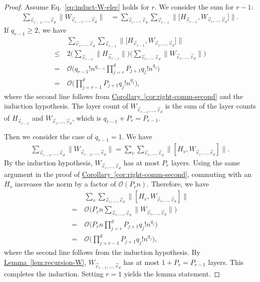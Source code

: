 \documentclass[aps,pra,reprint,groupedaddress,floatfix]{revtex4-2}
\newcommand{\cor}[1]{\hyperref[cor:#1]{Corollary~\ref*{cor:#1}}}
\newcommand{\lem}[1]{\hyperref[lem:#1]{Lemma~\ref*{lem:#1}}}
\newcommand{\mc}{\mathcal}
\begin{document}
\begin{proof}
    Assume Eq.~\eqref{eq:induct-W-elec} holds for $r$. We consider the sum for $r-1$:
    \begin{align*}
        \sum_{\vec{v}_{r-1}, \ldots, \vec{v}_d} \Big\|W_{\vec{v}_{r-1}, \ldots, \vec{v}_d}\Big\| 
        &= \sum_{\vec{v}_{r}, \ldots, \vec{v}_d} \sum_{\vec{v}_{r-1}} \bigg\| \Big[ H_{\vec{v}_{r-1}}, W_{\vec{v}_{r}, \ldots, \vec{v}_d} \Big] \bigg\|.
    \end{align*}
    If $q_{r-1}\ge 2$, we have
    \begin{align*}
        &\sum_{\vec{v}_{r}, \ldots, \vec{v}_d} \sum_{\vec{v}_{r-1}} \bigg\| \Big[ H_{\vec{v}_{r-1}}, W_{\vec{v}_{r}, \ldots, \vec{v}_d} \Big] \bigg\| \\
        \le~& 2\Big(\sum_{\vec{v}_{r-1}}\|H_{\vec{v}_{r-1}}\|\Big)\Big(\sum_{\vec{v}_{r}, \ldots, \vec{v}_d}\|W_{\vec{v}_{r}, \ldots, \vec{v}_d}\|\Big) \\
        =~& \mc{O}\Big(q_{r-1}!n^{q_{r-1}}\prod_{j=r}^{d}P_{j+1} q_j! n^{q_j}\Big)\\
        =~& \mc{O}\Big(\prod_{j=r-1}^{d}P_{j+1} q_j! n^{q_j}\Big),
    \end{align*}
    where the second line follows from \cor{right-comm-second} and the induction hypothesis. The layer count of $W_{\vec{v}_{r-1}, \ldots, \vec{v}_d}$ is the sum of the layer counts of $H_{\vec{v}_{r-1}}$ and $W_{\vec{v}_{r}, \ldots, \vec{v}_d}$, which is $q_{r-1}+ P_{r} = P_{r-1}$. 
    
    Then we consider the case of $q_{r-1}=1$. We have 
    \begin{align*}
        \sum_{\vec{v}_{r-1}, \ldots, \vec{v}_d} \Big\|W_{\vec{v}_{r-1}, \ldots, \vec{v}_d}\Big\| 
       = \sum_{v}\sum_{\vec{v}_{r}, \ldots, \vec{v}_d} \Big\|[H_{v},W_{\vec{v}_{r}, \ldots, \vec{v}_d}]\Big\|.
    \end{align*}
    By the induction hypothesis, $W_{\vec{v}_{r}, \ldots, \vec{v}_d}$ has at most $P_{r}$ layers. Using the same argument in the proof of \cor{right-comm-second}, commuting with an $H_v$ increases the norm by a factor of $\mc{O}(P_r n)$. Therefore, we have
    \begin{align*}
        & \sum_{v}\sum_{\vec{v}_{r}, \ldots, \vec{v}_d} \Big\|[H_{v},W_{\vec{v}_{r}, \ldots, \vec{v}_d}]\Big\| \\
        =~& \mc{O}\Big(P_r n \sum_{\vec{v}_{r}, \ldots, \vec{v}_d} \|W_{\vec{v}_{r}, \ldots, \vec{v}_d}\|\Big)\\
        =~& \mc{O}\Big(P_r n \prod_{j=r}^{d}P_{j+1} q_j! n^{q_j}\Big) \\
        =~& \mc{O}\Big( \prod_{j=r-1}^{d}P_{j+1} q_j! n^{q_j}\Big),
    \end{align*}
    where the second line follows from the induction hypothesis. By \lem{recursion-W}, $W_{\vec{v}_{r-1}, \ldots, \vec{v}_d}$ has at most $1+P_{r} = P_{r-1}$ layers.  
    This completes the induction. Setting $r=1$ yields the lemma statement.
\end{proof}
\end{document}

